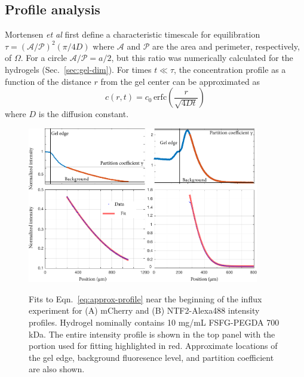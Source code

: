 \subsection{Profile analysis}
\label{sec:profile-analysis}

Mortensen \textit{et al} first define a characteristic timescale for equilibration $\tau = (\mathcal{A}/\mathcal{P})^2 (\pi/4D)$ where $\mathcal{A}$ and $\mathcal{P}$ are the area and perimeter, respectively, of $\Omega$.  For a circle $\mathcal{A}/\mathcal{P} = a/2$, but this ratio was numerically calculated for the hydrogels (Sec.~\ref{sec:gel-dim}).  For times $t \ll \tau$, the concentration profile as a function of the distance $r$ from the gel center can be approximated as 
\begin{equation}
c(r,t) = c_0 \,\mathrm{erfc}\left(\frac{r}{\sqrt{4Dt}}\right)
\label{eq:approx-profile}
\end{equation}
where $D$ is the diffusion constant.


\begin{figure}
\caption{Fits to Eqn.~\ref{eq:approx-profile} near the beginning of the influx experiment for (A) mCherry and (B) NTF2-Alexa488 intensity profiles.  Hydrogel nominally contains 10 mg/mL FSFG-PEGDA 700 kDa.  The entire intensity profile is shown in the top panel with the portion used for fitting highlighted in red.  Approximate locations of the gel edge, background fluoresence level, and partition coefficient are also shown.}
\centering
\includegraphics[width=0.9\textwidth]{figs/ch04/erfc-position.pdf}
\label{fig:erfc-position}
\end{figure} 

